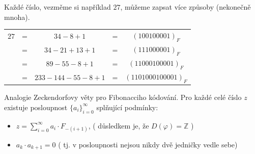\documentclass[czech,bachelor,dept470,male]{diploma}
\newcommand{\posla}{\{a_i\}_{i=0}^{\infty}}
\begin{document}
\begin{example}
	Každé číslo, vezměme si například $27$, můžeme zapsat více způsoby (nekonečně mnoha).\newline
	\begin{center}\begin{tabular}{c c c c c}
			$27$ & = & $34-8+1$         & = & $ (100100001)_F$     \\
			     & = & $34-21+13+1$     & = & $ (111000001)_F$     \\
			     & = & $89-55-8+1$      & = & $ (11000100001)_F$   \\
			     & = & $233-144-55-8+1$ & = & $ (1101000100001)_F$ \\
		\end{tabular}\end{center}
\end{example}
\begin{theorem}
	Analogie Zeckendorfovy věty pro Fibonacciho kódování. \cite{fibCoding}\newline
	Pro každé celé číslo $z$ existuje posloupnost $\posla$ splňující podmínky:
	\begin{itemize}
		\item $z=\sum_{i=0}^{\infty}a_i\cdot F_{-(i+1)}$, ( důsledkem je, že $D(\varphi) = \mathbb{Z}$ )
		\item $a_k\cdot a_{k+1}=0$ ( tj. v posloupnosti nejsou nikdy dvě jedničky vedle sebe)
	\end{itemize}
\end{theorem}
\end{document}
